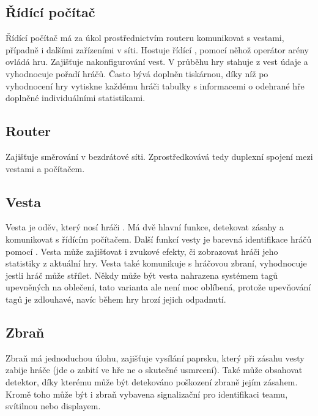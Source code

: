 \subsection{Řídící počítač}
Řídící počítač má za úkol prostřednictvím routeru komunikovat s vestami, případně i dalšími zařízeními v síti. Hostuje řídící , pomocí něhož operátor arény ovládá hru. Zajišťuje nakonfigurování vest. V průběhu hry stahuje z vest údaje a vyhodnocuje pořadí hráčů. Často bývá doplněn tiskárnou, díky níž po vyhodnocení hry vytiskne každému hráči tabulky s informacemi o odehrané hře doplněné individuálními statistikami.

\subsection{Router}
Zajišťuje směrování v bezdrátové  síti. Zprostředkovává tedy duplexní spojení mezi vestami a počítačem.

\subsection{Vesta}
Vesta je oděv, který nosí hráči . Má dvě hlavní funkce, detekovat zásahy a komunikovat s řídícím počítačem. Další funkcí vesty je barevná identifikace hráčů pomocí  . Vesta může zajišťovat i zvukové efekty, či zobrazovat hráči jeho statistiky z aktuální hry. Vesta také komunikuje s hráčovou zbraní, vyhodnocuje jestli hráč může střílet. Někdy může být vesta nahrazena systémem tagů upevněných na oblečení, tato varianta ale není moc oblíbená, protože upevňování tagů je zdlouhavé, navíc během hry hrozí jejich odpadnutí.

\subsection{Zbraň}
Zbraň má jednoduchou úlohu, zajišťuje vysílání  paprsku, který při zásahu vesty zabije hráče (jde o zabití ve hře ne o skutečné usmrcení). Také může obsahovat  detektor, díky kterému může být detekováno poškození zbraně jejím zásahem. Kromě toho může být i zbraň vybavena signalizační  pro identifikaci teamu, svítilnou nebo displayem.
